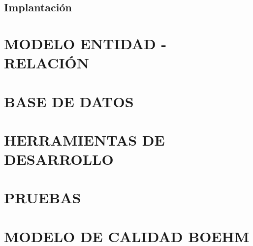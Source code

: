 	\subsection{Implantación}
	\section{MODELO ENTIDAD - RELACIÓN}
	\section{BASE DE DATOS}
	\section{HERRAMIENTAS DE DESARROLLO}
	\section{PRUEBAS}
	\section{MODELO DE CALIDAD BOEHM}
		
	
	

	
	
	


